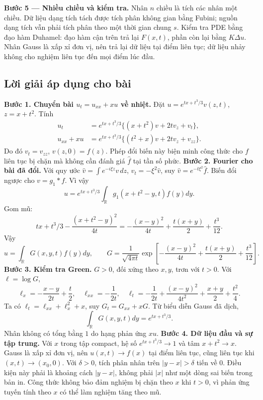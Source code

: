 \documentclass[10pt,a4paper]{article}
\begin{document}
\textbf{Bước 5 — Nhiều chiều và kiểm tra.} Nhân $n$ chiều là tích các nhân một chiều. Dữ liệu dạng tích tách được tích phân không gian bằng Fubini; nguồn dạng tích vẫn phải tích phân theo một thời gian chung $s$. Kiểm tra PDE bằng đạo hàm Duhamel: đạo hàm cận trên trả lại $F(x,t)$, phần còn lại bằng $K\Delta u$. Nhân Gauss là xấp xỉ đơn vị, nên trả lại dữ liệu tại điểm liên tục; dữ liệu nhảy không cho nghiệm liên tục đến mọi điểm lúc đầu.
\subsection*{Lời giải áp dụng cho bài}
\textbf{Bước 1. Chuyển bài $u_t=u_{xx}+xu$ về nhiệt.}
Đặt $u=e^{tx+t^3/3}v(z,t)$, $z=x+t^2$. Tính
\begin{align*}
u_t&=e^{tx+t^3/3}\{(x+t^2)v+2tv_z+v_t\},\\
u_{xx}+xu&=e^{tx+t^3/3}\{(t^2+x)v+2tv_z+v_{zz}\}.
\end{align*}
Do đó $v_t=v_{zz}$, $v(z,0)=f(z)$. Phép đổi biến này biện minh công thức cho $f$ liên tục bị chặn mà không cần đánh giá $\widehat f$ tại tần số phức.
\textbf{Bước 2. Fourier cho bài đã đổi.} Với quy ước $\widehat v=\int e^{-i\xi z}v\,dz$, $\widehat v_t=-\xi^2\widehat v$, suy $\widehat v=e^{-t\xi^2}\widehat f$. Biến đổi ngược cho $v=g_1*f$. Vì vậy
\[u=e^{tx+t^3/3}\int_{\mathbb R}g_1(x+t^2-y,t)f(y)dy.\]
Gom mũ:
\[tx+t^3/3-\frac{(x+t^2-y)^2}{4t}
=-\frac{(x-y)^2}{4t}+\frac{t(x+y)}2+\frac{t^3}{12}.\]
Vậy
\[u=\int_{\mathbb R}G(x,y,t)f(y)dy,\qquad
G=\frac1{\sqrt{4\pi t}}
\exp\left[-\frac{(x-y)^2}{4t}+\frac{t(x+y)}2+\frac{t^3}{12}\right].\]
\textbf{Bước 3. Kiểm tra Green.} $G>0$, đối xứng theo $x,y$, trơn với $t>0$. Với $\ell=\log G$,
\[\ell_x=-\frac{x-y}{2t}+\frac t2,\quad \ell_{xx}=-\frac1{2t},\quad
\ell_t=-\frac1{2t}+\frac{(x-y)^2}{4t^2}+\frac{x+y}2+\frac{t^2}4.\]
Ta có $\ell_t=\ell_{xx}+\ell_x^2+x$, suy $G_t=G_{xx}+xG$. Từ biểu diễn Gauss đã dịch,
\[\int_{\mathbb R}G(x,y,t)dy=e^{tx+t^3/3}.\]
Nhân không có tổng bằng $1$ do hạng phản ứng $xu$.
\textbf{Bước 4. Dữ liệu đầu và sự tập trung.} Với $x$ trong tập compact, hệ số $e^{tx+t^3/3}\to1$ và tâm $x+t^2\to x$. Gauss là xấp xỉ đơn vị, nên $u(x,t)\to f(x)$ tại điểm liên tục, cũng liên tục khi $(x,t)\to(x_0,0)$. Với $\delta>0$, tích phân nhân trên $|y-x|>\delta$ tiến về $0$. Điều kiện này phải là khoảng cách $|y-x|$, không phải $|x|$ như một dòng sai biến trong bản in. Công thức không bảo đảm nghiệm bị chặn theo $x$ khi $t>0$, vì phản ứng tuyến tính theo $x$ có thể làm nghiệm tăng theo mũ.
\end{document}
